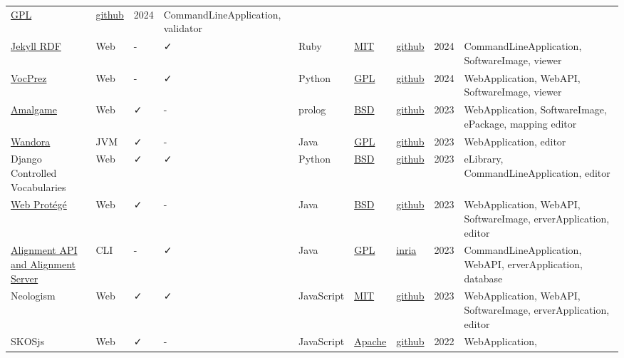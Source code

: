 \documentclass[
  DIV=10]{article}
\begin{document}
\begin{longtable}[]{@{}lllllllll@{}}
\href{https://spdx.org/licenses/GPL-3.0-or-later}{GPL} &
\href{https://github.com/cmader/qSKOS/}{github} & 2024 &
CommandLineApplication, validator \\
\href{https://github.com/AKSW/jekyll-rdf}{Jekyll RDF} & Web & - & ✓ &
Ruby & \href{https://spdx.org/licenses/MIT}{MIT} &
\href{https://github.com/AKSW/jekyll-rdf}{github} & 2024 &
CommandLineApplication, SoftwareImage, viewer \\
\href{https://github.com/RDFLib/VocPrez}{VocPrez} & Web & - & ✓ & Python
& \href{https://spdx.org/licenses/GPL-3.0-or-later}{GPL} &
\href{https://github.com/RDFLib/VocPrez}{github} & 2024 &
WebApplication, WebAPI, SoftwareImage, viewer \\
\href{https://semanticweb.cs.vu.nl/amalgame/}{Amalgame} & Web & ✓ & - &
prolog & \href{https://spdx.org/licenses/BSD-3-Clause}{BSD} &
\href{https://github.com/jrvosse/amalgame}{github} & 2023 &
WebApplication, SoftwareImage, ePackage, mapping editor \\
\href{http://wandora.org/www/}{Wandora} & JVM & ✓ & - & Java &
\href{https://spdx.org/licenses/GPL-3.0-or-later}{GPL} &
\href{https://github.com/wandora-team/wandora}{github} & 2023 &
WebApplication, editor \\
Django Controlled Vocabularies & Web & ✓ & ✓ & Python &
\href{https://spdx.org/licenses/BSD-3-Clause}{BSD} &
\href{https://github.com/unt-libraries/django-controlled-vocabularies}{github}
& 2023 & eLibrary, CommandLineApplication, editor \\
\href{https://protegewiki.stanford.edu/wiki/WebProtege}{Web Protégé} &
Web & ✓ & - & Java & \href{https://spdx.org/licenses/BSD-3-Clause}{BSD}
& \href{https://github.com/protegeproject/webprotege}{github} & 2023 &
WebApplication, WebAPI, SoftwareImage, erverApplication, editor \\
\href{https://moex.gitlabpages.inria.fr/alignapi/}{Alignment API and
Alignment Server} & CLI & - & ✓ & Java &
\href{https://spdx.org/licenses/GPL-3.0-or-later}{GPL} &
\href{https://gitlab.inria.fr/moex/alignapi/}{inria} & 2023 &
CommandLineApplication, WebAPI, erverApplication, database \\
Neologism & Web & ✓ & ✓ & JavaScript &
\href{https://spdx.org/licenses/MIT}{MIT} &
\href{https://github.com/Semantic-Society/Neologism}{github} & 2023 &
WebApplication, WebAPI, SoftwareImage, erverApplication, editor \\
SKOSjs & Web & ✓ & - & JavaScript &
\href{https://spdx.org/licenses/Apache-2.0}{Apache} &
\href{https://github.com/tkurz/skosjs}{github} & 2022 & WebApplication,

\end{longtable}
\end{document}
